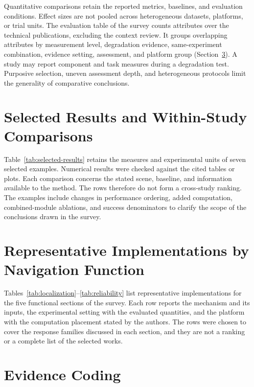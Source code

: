 \documentclass[journal]{IEEEtran}
\begin{document}
Quantitative comparisons retain the reported metrics, baselines, and evaluation conditions. Effect sizes are not pooled across heterogeneous datasets, platforms, or trial units. The evaluation table of the survey counts attributes over the \CoreCount{} technical publications, excluding the context review. It groups overlapping attributes by measurement level, degradation evidence, same-experiment combination, evidence setting, assessment, and platform group (Section~\ref{supp:coding}). A study may report component and task measures during a degradation test. Purposive selection, uneven assessment depth, and heterogeneous protocols limit the generality of comparative conclusions.

\section{Selected Results and Within-Study Comparisons}
\label{supp:results}

Table~\ref{tab:selected-results} retains the measures and experimental units of seven selected examples. Numerical results were checked against the cited tables or plots. Each comparison concerns the stated scene, baseline, and information available to the method. The rows therefore do not form a cross-study ranking. The examples include changes in performance ordering, added computation, combined-module ablations, and success denominators to clarify the scope of the conclusions drawn in the survey.

\section{Representative Implementations by Navigation Function}
\label{supp:implementations}

Tables~\ref{tab:localization}--\ref{tab:reliability} list representative implementations for the five functional sections of the survey. Each row reports the mechanism and its inputs, the experimental setting with the evaluated quantities, and the platform with the computation placement stated by the authors. The rows were chosen to cover the response families discussed in each section, and they are not a ranking or a complete list of the selected works.







\section{Evidence Coding}
\label{supp:coding}
\end{document}

